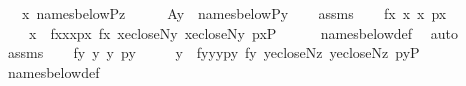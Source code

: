 \begin{isabellebody}
\ \ \ {\isachardoublequoteopen}x{\isasymin}\ names{\isacharunderscore}{\kern0pt}below{\isacharparenleft}{\kern0pt}P{\isacharcomma}{\kern0pt}z{\isacharparenright}{\kern0pt}{\isachardoublequoteclose}\isanewline
%
\isadelimproof
%
\endisadelimproof
%
\isatagproof
{}\isamarkupfalse%
\ {\isacharminus}{\kern0pt}\isanewline
\ \ \isamarkupfalse%
\ {\isacharquery}{\kern0pt}A{\isacharequal}{\kern0pt}{\isachardoublequoteopen}{\isasymlambda}y\ {\isachardot}{\kern0pt}\ names{\isacharunderscore}{\kern0pt}below{\isacharparenleft}{\kern0pt}P{\isacharcomma}{\kern0pt}y{\isacharparenright}{\kern0pt}{\isachardoublequoteclose}\isanewline
\ \ \isamarkupfalse%
\ assms\isanewline
\ \ \isamarkupfalse%
\ fx\ x{}\ x{}\ px\ \isanewline
\ \ \ \ {\isachardoublequoteopen}x\ {\isacharequal}{\kern0pt}\ {\isasymlangle}fx{\isacharcomma}{\kern0pt}x{}{\isacharcomma}{\kern0pt}x{}{\isacharcomma}{\kern0pt}px{\isasymrangle}{\isachardoublequoteclose}\ {\isachardoublequoteopen}fx{\isasymin}{}{\isachardoublequoteclose}\ {\isachardoublequoteopen}x{}{\isasymin}ecloseN{\isacharparenleft}{\kern0pt}y{\isacharparenright}{\kern0pt}{\isachardoublequoteclose}\ {\isachardoublequoteopen}x{}{\isasymin}ecloseN{\isacharparenleft}{\kern0pt}y{\isacharparenright}{\kern0pt}{\isachardoublequoteclose}\ {\isachardoublequoteopen}px{\isasymin}P{\isachardoublequoteclose}\isanewline
\ \ \ \ \isamarkupfalse%
\ names{\isacharunderscore}{\kern0pt}below{\isacharunderscore}{\kern0pt}def\ \isamarkupfalse%
\ auto\isanewline
\ \ \isamarkupfalse%
\ assms\isanewline
\ \ \isamarkupfalse%
\ fy\ y{}\ y{}\ py\ \isanewline
\ \ \ \ {\isachardoublequoteopen}y\ {\isacharequal}{\kern0pt}\ {\isasymlangle}fy{\isacharcomma}{\kern0pt}y{}{\isacharcomma}{\kern0pt}y{}{\isacharcomma}{\kern0pt}py{\isasymrangle}{\isachardoublequoteclose}\ {\isachardoublequoteopen}fy{\isasymin}{}{\isachardoublequoteclose}\ {\isachardoublequoteopen}y{}{\isasymin}ecloseN{\isacharparenleft}{\kern0pt}z{\isacharparenright}{\kern0pt}{\isachardoublequoteclose}\ {\isachardoublequoteopen}y{}{\isasymin}ecloseN{\isacharparenleft}{\kern0pt}z{\isacharparenright}{\kern0pt}{\isachardoublequoteclose}\ {\isachardoublequoteopen}py{\isasymin}P{\isachardoublequoteclose}\isanewline
\ \ \ \ \isamarkupfalse%
\ names{\isacharunderscore}{\kern0pt}below{\isacharunderscore}{\kern0pt}def\ \isamarkupfalse%

\end{isabellebody}
